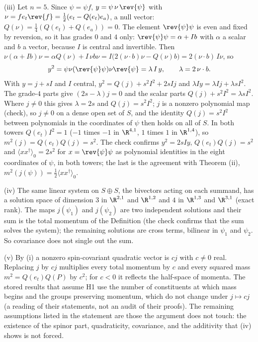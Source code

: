 (iii) Let $n = 5$. Since $\psi = \psi f$, $y = \psi\,\nu\,\rev{\psi}$ with $\nu = f e_{t}\rev{f} = \tfrac12(e_{t} - Q(e_{t})e_{a})$, a null vector: $Q(\nu) = \tfrac14(Q(e_{t}) + Q(e_{a})) = 0$. The element $\rev{\psi}\psi$ is even and fixed by reversion, so it has grades $0$ and $4$ only: $\rev{\psi}\psi = \alpha + Ib$ with $\alpha$ a scalar and $b$ a vector, because $I$ is central and invertible. Then $\nu(\alpha + Ib)\nu = \alpha Q(\nu) + I\,\nu b\nu = I\bigl(2(\nu\cdot b)\nu - Q(\nu)b\bigr) = 2(\nu\cdot b)\,I\nu$, so
\[
y^{2} = \psi\nu(\rev{\psi}\psi)\nu\rev{\psi} = \lambda\,I\,y, \qquad \lambda = 2\,\nu\cdot b .
\]
With $y = j + sI$ and $I$ central, $y^{2} = Q(j) + s^{2}I^{2} + 2sIj$ and $\lambda Iy = \lambda Ij + \lambda sI^{2}$. The grade-$4$ parts give $(2s - \lambda)j = 0$ and the scalar parts $Q(j) + s^{2}I^{2} = \lambda sI^{2}$. Where $j \ne 0$ this gives $\lambda = 2s$ and $Q(j) = s^{2}I^{2}$; $j$ is a nonzero polynomial map (check), so $j \ne 0$ on a dense open set of $S$, and the identity $Q(j) = s^{2}I^{2}$ between polynomials in the coordinates of $\psi$ then holds on all of $S$. In both towers $Q(e_{t})I^{2} = 1$ ($-1$ times $-1$ in $\R^{4,1}$, $1$ times $1$ in $\R^{1,4}$), so $m^{2}(j) = Q(e_{t})Q(j) = s^{2}$. The check confirms $y^{2} = 2sIy$, $Q(e_{t})Q(j) = s^{2}$ and $\langle xx^{\dagger}\rangle_{0} = 2s^{2}$ for $x = \rev{\psi}\psi$ as polynomial identities in the eight coordinates of $\psi$, in both towers; the last is the agreement with Theorem (ii), $m^{2}(j(\psi)) = \tfrac12\langle xx^{\dagger}\rangle_{0}$.

(iv) The same linear system on $S \oplus S$, the bivectors acting on each summand, has a solution space of dimension $3$ in $\R^{2,1}$ and $\R^{1,2}$ and $4$ in $\R^{1,3}$ and $\R^{3,1}$ (exact rank). The maps $j(\psi_{1})$ and $j(\psi_{2})$ are two independent solutions and their sum is the total momentum of the Definition (the check confirms that the sum solves the system); the remaining solutions are cross terms, bilinear in $\psi_{1}$ and $\psi_{2}$. So covariance does not single out the sum.

(v) By (i) a nonzero spin-covariant quadratic vector is $cj$ with $c \ne 0$ real. Replacing $j$ by $cj$ multiplies every total momentum by $c$ and every squared mass $m^{2} = Q(e_{t})Q(P)$ by $c^{2}$; for $c < 0$ it reflects the half-space of momenta. The stored results that assume H1 use the number of constituents at which mass begins and the groups preserving momentum, which do not change under $j \mapsto cj$ (a reading of their statements, not an audit of their proofs). The remaining assumptions listed in the statement are those the argument does not touch: the existence of the spinor part, quadraticity, covariance, and the additivity that (iv) shows is not forced.
